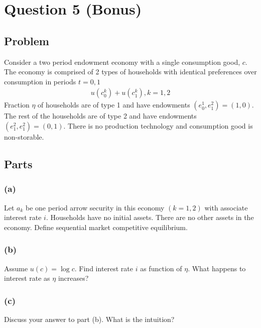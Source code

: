 \documentclass[10pt, a4paper]{article}
\begin{document}
\section*{Question 5 (Bonus)}
  \subsection*{Problem}
    Consider a two period endowment economy with a single consumption good, $c$. The economy is comprised of 2 types of households with identical preferences over consumption in periods $t = 0,1$
    \begin{gather*}
      u(c^k_0) + u(c^k_1), k = 1,2
    \end{gather*}
    Fraction $\eta$ of households are of type 1 and have endowments $(e^1_0, e^2_1) = (1,0)$. The rest of the households are of type 2 and have endowments $(e^2_1, e^2_1) = (0,1)$. There is no production technology and consumption good is non-storable.
  \subsection*{Parts}
    \subsubsection*{(a)}
      Let $a_k$ be one period arrow security in this economy $(k = 1,2)$ with associate interest rate $i$. Households have no initial assets. There are no other assets in the economy. Define sequential market competitive equilibrium.
    \subsubsection*{(b)}
      Assume $u(c) = \log c$. Find interest rate $i$ as function of $\eta$. What happens to interest rate as $\eta$ increases?
    \subsubsection*{(c)}
      Discuss your answer to part (b). What is the intuition?
\end{document}

